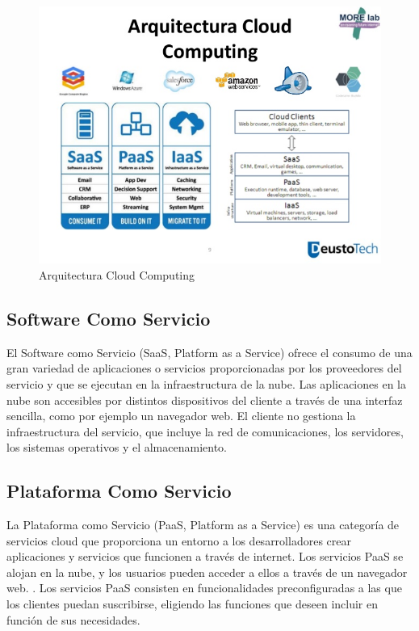 \documentclass[a4paper,11pt]{book}
\begin{document}
 
\begin{figure}[H] 
\centering 
\includegraphics[scale=0.5]{imagenes/desarrollo_herramienta/arquitecturaCC.jpg}
\caption{ Arquitectura Cloud Computing\cite{arquitecturaCC} }
\end{figure}

\subsection{Software Como Servicio}

El Software como Servicio\cite{saas} (SaaS, Platform as a Service) ofrece el consumo de una gran variedad de aplicaciones o servicios proporcionadas por los proveedores del servicio y que se ejecutan en la infraestructura de la nube. Las aplicaciones en la nube son accesibles por distintos dispositivos del cliente a través de una interfaz sencilla, como por ejemplo un navegador web. El cliente no gestiona la infraestructura del servicio, que incluye la red de comunicaciones, los servidores, los sistemas operativos y el almacenamiento.

\subsection{Plataforma Como Servicio}

La Plataforma como Servicio\cite{paas} (PaaS, Platform as a Service) es una categoría de servicios cloud que proporciona un entorno a los desarrolladores crear aplicaciones y servicios que funcionen a través de internet. Los servicios PaaS se alojan en la nube, y los usuarios pueden acceder a ellos a través de un navegador web. . Los servicios PaaS consisten en funcionalidades preconfiguradas a las que los clientes puedan suscribirse, eligiendo las funciones que deseen incluir en función de sus necesidades.
\end{document}
